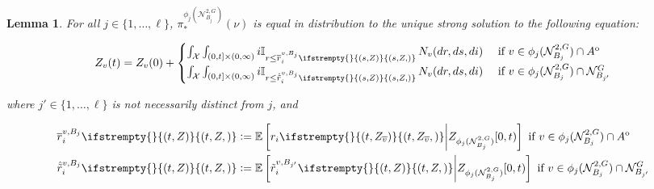 \documentclass[12pt]{article}
\newcommand{\mb}{\mathbb}
\newcommand{\mc}{\mathcal}
\newcommand{\ov}{\overline}
\newcommand{\te}{\text}
\newcommand{\ex}[1]{\mb{E}\left[#1\right]}			%
\newcommand{\defeq}{:=}								%
\newcommand{\sta}{\mc{X}}							%
\newcommand{\gneigh}[2]{\mc{N}^{#1}_{#2}}			%
\newcommand{\dgneigh}[2]{\mc{N}^{2,#1}_{#2}}		%
\newcommand{\cl}[1]{\ov{#1}}						%
\newcommand{\poiss}{N}								%
\newcommand{\rate}{r}								%
\newcommand{\proj}{\pi}								%
\newcommand{\poissv}[1]{_{#1}}						%
\newcommand{\vind}[1]{_{#1}}						%
\newcommand{\tme}[1]{(#1)}							%
\newcommand{\tmi}[1]{#1}							%
\newcommand{\vpara}[1]{^{#1}}						%
\newcommand{\stpara}[1]{_{#1}}						%
\newcommand{\psf}{_*}								%
\newcommand{\psize}{\ell}							%
\newcommand{\tmepro}[3]{
\ifstrempty{#3}{
	\left(#1,#2\right)}{
	\left(#1,#2,#3\right)}}							%
\newcommand{\brate}{\alt{\rate}}					%
\newcommand{\inte}[1]{{#1}^\mathrm{o}}				%
\newcommand{\alt}[1]{\tilde{#1}}					%
\newcommand{\mm}{\nu}								%
\newcommand{\Xh}{Z}									%
\newcommand{\bgrate}{\ov{\rate}}					%
\newcommand{\bcrate}{\hat{\brate}}					%
\newcommand{\vjpara}[2]{^{#1,#2}}					%
\newtheorem{lem}[thms]{Lemma}
\begin{document}
\begin{lem}
For all \(j \in \{1,\dots,\psize\}\), \(\proj\psf\vpara{\phi_j(\dgneigh{G}{B_j})}(\mm)\) is equal in distribution to the unique strong solution to the following equation:

\begin{equation}
\Xh\vind{v}\tme{t} = \Xh\vind{v}\tme{0} + \begin{cases}
\int_\sta\int_{(0,t]\times (0,\infty)} i\mb{I}_{r \leq \bgrate\vjpara{v}{B_j}\stpara{i}\tmepro{s}{\Xh}{}}\,\poiss\poissv{v}(dr,ds,di)&\te{ if } v \in \phi_j(\dgneigh{G}{B_j})\cap \inte{A}\\
\int_\sta\int_{(0,t]\times (0,\infty)} i\mb{I}_{r \leq \bcrate\vjpara{v}{B_j}\stpara{i}\tmepro{s}{\Xh}{}}\,\poiss\poissv{v}(dr,ds,di)&\te{ if } v \in \phi_j(\dgneigh{G}{B_j})\cap\gneigh{G}{B_{j'}}
\end{cases}
\label{Uq::marg1eqn}
\end{equation}

where \(j' \in \{1,\dots,\psize\}\) is not necessarily distinct from \(j\), and

\begin{align}
\bgrate\vjpara{v}{B_j}\stpara{i}\tmepro{t}{\Xh}{} &\defeq \ex{\rate\stpara{i}\tmepro{t}{\Xh\vind{\cl{v}}}{}\middle|\Xh\vind{\phi_j(\dgneigh{G}{B_j})}\tmi{[0,t)}} \te{ if } v \in  \phi_j(\dgneigh{G}{B_j})\cap \inte{A} \label{Uq::brrt}\\
\bcrate\vjpara{v}{B_j}\stpara{i}\tmepro{t}{\Xh}{} &\defeq \ex{\brate\vjpara{v}{B_{j'}}\stpara{i}\tmepro{t}{\Xh}{}\middle| \Xh\vind{\phi_j(\dgneigh{G}{B_j})}\tmi{[0,t)}} \te{ if } v \in \phi_j(\dgneigh{G}{B_j})\cap\gneigh{G}{B_{j'}}\label{Uq::brcdrt}
\end{align}
\label{Uq::marg}
\end{lem}
\end{document}
